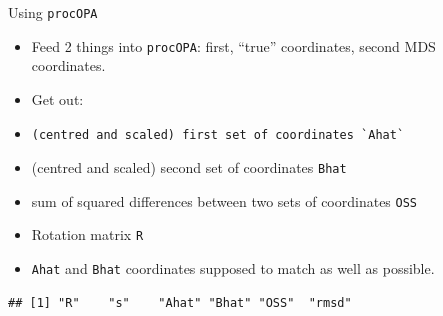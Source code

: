 \documentclass[ignorenonframetext,]{beamer}
\newenvironment{Shaded}{\begin{snugshade}}{\end{snugshade}}
\newcommand{\FloatTok}[1]{\textcolor[rgb]{0.00,0.00,0.81}{#1}}
\newcommand{\KeywordTok}[1]{\textcolor[rgb]{0.13,0.29,0.53}{\textbf{#1}}}
\newcommand{\NormalTok}[1]{#1}
\newcommand{\OperatorTok}[1]{\textcolor[rgb]{0.81,0.36,0.00}{\textbf{#1}}}
\newcommand{\StringTok}[1]{\textcolor[rgb]{0.31,0.60,0.02}{#1}}
\begin{document}
\begin{frame}[fragile]{Using \texttt{procOPA}}
\protect\hypertarget{using-procopa}{}

\begin{itemize}
\item
  Feed 2 things into \texttt{procOPA}: first, ``true'' coordinates,
  second MDS coordinates.
\item
  Get out:
\item
\begin{verbatim}
(centred and scaled) first set of coordinates `Ahat`
\end{verbatim}
\item
  (centred and scaled) second set of coordinates \texttt{Bhat}
\item
  sum of squared differences between two sets of coordinates
  \texttt{OSS}
\item
  Rotation matrix \texttt{R}
\item
  \texttt{Ahat} and \texttt{Bhat} coordinates supposed to match as well
  as possible.
\end{itemize}

\begin{Shaded}
\end{Shaded}

\begin{verbatim}
## [1] "R"    "s"    "Ahat" "Bhat" "OSS"  "rmsd"
\end{verbatim}

\end{frame}
\end{document}
